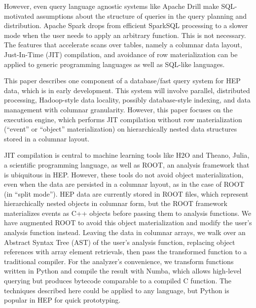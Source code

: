 \documentclass[10pt, conference, compsocconf]{IEEEtran}
\begin{document}
However, even query language agnostic systems like Apache Drill\cite{drill} make SQL-motivated assumptions about the structure of queries in the query planning and distribution. Apache Spark\cite{spark} drops from efficient SparkSQL\cite{sparksql} processing to a slower mode when the user needs to apply an arbitrary function. This is not necessary. The features that accelerate scans over tables, namely a columnar data layout, Just-In-Time (JIT) compilation, and avoidance of row materialization can be applied to generic programming languages as well as SQL-like languages.

This paper describes one component of a database/fast query system for HEP data, which is in early development. This system will involve parallel, distributed processing, Hadoop-style data locality, possibly database-style indexing, and data management with columnar granularity. However, this paper focuses on the execution engine, which performs JIT compilation without row materialization (``event'' or ``object'' materialization) on hierarchically nested data structures stored in a columnar layout.

JIT compilation is central to machine learning tools like H2O\cite{h2o} and Theano\cite{theano}, Julia\cite{julia}, a scientific programming language, as well as ROOT\cite{root}, an analysis framework that is ubiquitous in HEP. However, these tools do not avoid object materialization, even when the data are persisted in a columnar layout, as in the case of ROOT (in ``split mode''). HEP data are currently stored in ROOT files, which represent hierarchically nested objects in columnar form, but the ROOT framework materializes events as C++ objects before passing them to analysis functions. We have augmented ROOT\cite{bulkio} to avoid this object materialization and modify the user's analysis function instead. Leaving the data in columnar arrays, we walk over an Abstract Syntax Tree (AST) of the user's analysis function, replacing object references with array element retrievals, then pass the transformed function to a traditional compiler. For the analyzer's convenience, we transform functions written in Python and compile the result with Numba\cite{numba}, which allows high-level querying but produces bytecode comparable to a compiled C function. The techniques described here could be applied to any language, but Python is popular in HEP for quick prototyping.
\end{document}
